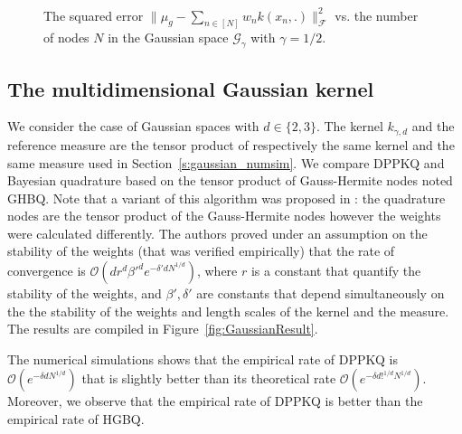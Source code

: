 \documentclass[twoside,11pt]{book}
\numberwithin{theorem}{chapter}
\numberwithin{definition}{chapter}
\numberwithin{proposition}{chapter}
\numberwithin{corollary}{chapter}
\numberwithin{example}{chapter}
\numberwithin{lemma}{chapter}
\numberwithin{assumption}{chapter}
\numberwithin{equation}{chapter}
\numberwithin{figure}{chapter}
\begin{document}
\begin{figure}
\\
\caption{The squared error $\|\mu_{g}-\sum\limits_{n \in [N]} w_{n}k(x_{n},.)\|_{\mathcal{F}}^{2}$ vs. the number of nodes $N$ in the Gaussian space $\mathcal{G}_{\gamma}$ with $\gamma = 1/2$.\label{fig:unidim_gaussian_dppkq}}
\end{figure}




\subsection{The multidimensional Gaussian kernel}\label{s:multigaussian_numsim}

We consider the case of Gaussian spaces with $d \in \{2,3\}$. The kernel $k_{\gamma,d}$ and the reference measure are the tensor product of respectively the same kernel and the same measure used in Section~\ref{s:gaussian_numsim}. We compare DPPKQ and Bayesian quadrature based on the tensor product of Gauss-Hermite nodes noted GHBQ. Note that a variant of this algorithm was proposed in \citep{KaSa19}: the quadrature nodes are the tensor product of the Gauss-Hermite nodes however the weights were calculated differently. The authors proved under an assumption on the stability of the weights (that was verified empirically) that the rate of convergence is $\mathcal{O}(dr^{d}\beta'^{d}e^{-\delta' d N^{1/d}})$, where $r$ is a constant that quantify the stability of the weights, and $\beta',\delta'$ are constants that depend simultaneously on the the stability of the weights and length scales of the kernel and the measure. The results are compiled in Figure~\ref{fig:GaussianResult}.

The numerical simulations shows that the empirical rate of DPPKQ is $\mathcal{O}(e^{-\delta d N^{1/d}})$ that is slightly better than its theoretical rate $\mathcal{O}(e^{-\delta d!^{1/d} N^{1/d}})$. Moreover, we observe that the empirical rate of DPPKQ is better than the empirical rate of HGBQ.
\end{document}

